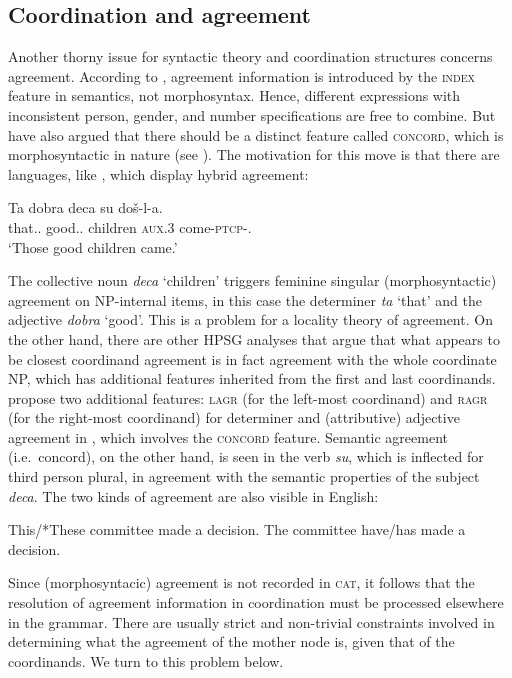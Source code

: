 \subsection{Coordination and agreement}


Another thorny issue for syntactic theory and coordination structures concerns agreement. According to 
\citet[Section~2.4.2]{pollardsag}, agreement information is introduced by the \textsc{index} feature in semantics, not morphosyntax. Hence, different expressions
with inconsistent person, gender, and number specifications are free to combine. But \citet[Chapter~2]{wechsler} have also argued that there should be a distinct feature called \textsc{concord}, which is morphosyntactic in nature (see ). The motivation for this move is that there are languages, like , 
which display hybrid agreement:

\ea
\gll Ta dobra deca su do\v{s}-l-a.\footnotemark\\
         that.\SG.\F{} good.\SG.\F{} children \textsc{aux}.3\PL{} come-\textsc{ptcp}-\N.\PL\\
\glt `Those good children came.'
\z

\noindent
The collective noun \emph{deca} `children' triggers feminine singular (morphosyntactic) agreement on NP-internal items, in this case the determiner \emph{ta} `that' and the adjective \emph{dobra} `good'.   This is a problem for a locality theory of agreement. On the other hand, there are other HPSG analyses that argue that what appears to be closest coordinand agreement is in fact agreement with the whole coordinate NP, which has additional features inherited from the first and last coordinands. \citet[Section~5]{Villavicencio:Sadler:ea:05} propose two additional features: \textsc{lagr} (for the left-most coordinand) and \textsc{ragr} (for the right-most coordinand) for determiner and (attributive) adjective agreement in , which involves the \textsc{concord} feature.
Semantic agreement (i.e.\ concord), on the other hand, is seen in the verb \emph{su}, which  is inflected for third person plural, in agreement with the semantic properties of the subject \emph{deca}. The two kinds of agreement are also visible in
English:

\eal
\ex This/*These committee made a decision.
\ex The committee have/has made a decision.
\zl


\noindent
Since (morphosyntacic) agreement is not recorded in \textsc{cat}, it follows that the resolution of agreement information in coordination must be processed elsewhere in the grammar. There are usually strict and non-trivial constraints involved in determining what the agreement of the mother node is, given that of the coordinands. We turn to this problem below.






